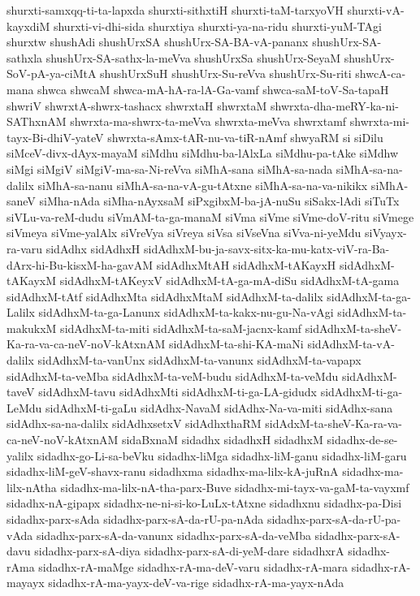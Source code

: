 {shurxti-samxqq-ti-ta-lapxda
shurxti-sithxtiH
shurxti-taM-tarxyoVH
shurxti-vA-kayxdiM
shurxti-vi-dhi-sida
shurxtiya
shurxti-ya-na-ridu
shurxti-yuM-TAgi
shurxtw
shushAdi
shushUrxSA
shushUrx-SA-BA-vA-pananx
shushUrx-SA-sathxla
shushUrx-SA-sathx-la-meVva
shushUrxSa
shushUrx-SeyaM
shushUrx-SoV-pA-ya-ciMtA
shushUrxSuH
shushUrx-Su-reVva
shushUrx-Su-riti
shwcA-ca-mana
shwca
shwcaM
shwca-mA-hA-ra-lA-Ga-vamf
shwca-saM-toV-Sa-tapaH
shwriV
shwrxtA-shwrx-tashacx
shwrxtaH
shwrxtaM
shwrxta-dha-meRY-ka-ni-SAThxnAM
shwrxta-ma-shwrx-ta-meVva
shwrxta-meVva
shwrxtamf
shwrxta-mi-tayx-Bi-dhiV-yateV
shwrxta-sAmx-tAR-nu-va-tiR-nAmf
shwyaRM
si
siDilu
siMceV-divx-dAyx-mayaM
siMdhu
siMdhu-ba-lAlxLa
siMdhu-pa-tAke
siMdhw
siMgi
siMgiV
siMgiV-ma-sa-Ni-reVva
siMhA-sana
siMhA-sa-nada
siMhA-sa-na-dalilx
siMhA-sa-nanu
siMhA-sa-na-vA-gu-tAtxne
siMhA-sa-na-va-nikikx
siMhA-saneV
siMha-nAda
siMha-nAyxsaM
siPxgibxM-ba-jA-nuSu
siSakx-lAdi
siTuTx
siVLu-va-reM-dudu
siVmAM-ta-ga-manaM
siVma
siVme
siVme-doV-ritu
siVmege
siVmeya
siVme-yalAlx
siVreVya
siVreya
siVsa
siVseVna
siVva-ni-yeMdu
siVyayx-ra-varu
sidAdhx
sidAdhxH
sidAdhxM-bu-ja-savx-sitx-ka-mu-katx-viV-ra-Ba-dArx-hi-Bu-kisxM-ha-gavAM
sidAdhxMtAH
sidAdhxM-tAKayxH
sidAdhxM-tAKayxM
sidAdhxM-tAKeyxV
sidAdhxM-tA-ga-mA-diSu
sidAdhxM-tA-gama
sidAdhxM-tAtf
sidAdhxMta
sidAdhxMtaM
sidAdhxM-ta-dalilx
sidAdhxM-ta-ga-Lalilx
sidAdhxM-ta-ga-Lanunx
sidAdhxM-ta-kakx-nu-gu-Na-vAgi
sidAdhxM-ta-makukxM
sidAdhxM-ta-miti
sidAdhxM-ta-saM-jacnx-kamf
sidAdhxM-ta-sheV-Ka-ra-va-ca-neV-noV-kAtxnAM
sidAdhxM-ta-shi-KA-maNi
sidAdhxM-ta-vA-dalilx
sidAdhxM-ta-vanUnx
sidAdhxM-ta-vanunx
sidAdhxM-ta-vapapx
sidAdhxM-ta-veMba
sidAdhxM-ta-veM-budu
sidAdhxM-ta-veMdu
sidAdhxM-taveV
sidAdhxM-tavu
sidAdhxMti
sidAdhxM-ti-ga-LA-gidudx
sidAdhxM-ti-ga-LeMdu
sidAdhxM-ti-gaLu
sidAdhx-NavaM
sidAdhx-Na-va-miti
sidAdhx-sana
sidAdhx-sa-na-dalilx
sidAdhxsetxV
sidAdhxthaRM
sidAdxM-ta-sheV-Ka-ra-va-ca-neV-noV-kAtxnAM
sidaBxnaM
sidadhx
sidadhxH
sidadhxM
sidadhx-de-se-yalilx
sidadhx-go-Li-sa-beVku
sidadhx-liMga
sidadhx-liM-ganu
sidadhx-liM-garu
sidadhx-liM-geV-shavx-ranu
sidadhxma
sidadhx-ma-lilx-kA-juRnA
sidadhx-ma-lilx-nAtha
sidadhx-ma-lilx-nA-tha-parx-Buve
sidadhx-mi-tayx-va-gaM-ta-vayxmf
sidadhx-nA-gipapx
sidadhx-ne-ni-si-ko-LuLx-tAtxne
sidadhxnu
sidadhx-pa-Disi
sidadhx-parx-sAda
sidadhx-parx-sA-da-rU-pa-nAda
sidadhx-parx-sA-da-rU-pa-vAda
sidadhx-parx-sA-da-vanunx
sidadhx-parx-sA-da-veMba
sidadhx-parx-sA-davu
sidadhx-parx-sA-diya
sidadhx-parx-sA-di-yeM-dare
sidadhxrA
sidadhx-rAma
sidadhx-rA-maMge
sidadhx-rA-ma-deV-varu
sidadhx-rA-mara
sidadhx-rA-mayayx
sidadhx-rA-ma-yayx-deV-va-rige
sidadhx-rA-ma-yayx-nAda
}

